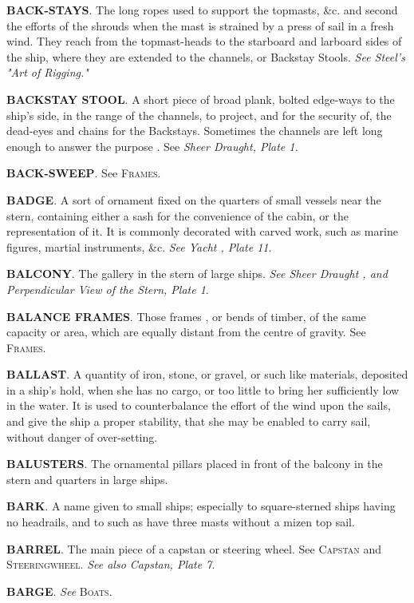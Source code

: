 \textbf{BACK-STAYS}. The long ropes used to support the topmasts, \&c. and second the efforts of the shrouds when the mast is strained by a press of sail in a fresh wind. They reach from the topmast-heads to the starboard and larboard sides of the ship, where they are extended to the channels, or Backstay Stools. \textit{See Steel's "Art of Rigging."}   

\textbf{BACKSTAY STOOL}. A short piece of broad plank, bolted edge-ways to the ship's side, in the range of the channels, to project, and for the security of, the dead-eyes and chains for the Backstays. Sometimes the channels are left long enough to answer the purpose . See \textit{Sheer Draught, Plate 1.} 

\textbf{BACK-SWEEP}. See \textsc{Frames}. 

\textbf{BADGE}. A sort of ornament fixed on the quarters of small vessels near the stern, containing either a sash for the convenience of the cabin, or the representation of it. It is commonly decorated with carved work, such as marine figures, martial instruments, \&c. \textit{See Yacht , Plate 11}. 

\textbf{BALCONY}. The gallery in the stern of large ships. \textit{See Sheer Draught , and Perpendicular View of the Stern, Plate 1}. 

\textbf{BALANCE FRAMES}. Those frames , or bends of timber, of the same capacity or area, which are equally distant from the centre of gravity. See \textsc{Frames}. 

\textbf{BALLAST}. A quantity of iron, stone, or gravel, or such like materials, deposited in a ship's hold, when she has no cargo, or too little to bring her sufficiently low in the water. It is used to counterbalance the effort of the wind upon the sails, and give the ship a proper stability, that she may be enabled to carry sail, without danger of over-setting. 

\textbf{BALUSTERS}. The ornamental pillars placed in front of the balcony in the stern and quarters in large ships. 

\textbf{BARK}. A name given to small ships; especially to square-sterned ships having no headrails, and to such as have three masts without a mizen top sail. 

\textbf{BARREL}. The main piece of a capstan or steering wheel. See \textsc{Capstan} and \textsc{Steeringwheel}. \textit{See also Capstan, Plate 7}. 

\textbf{BARGE}. \textit{See} \textsc{Boats}. 


